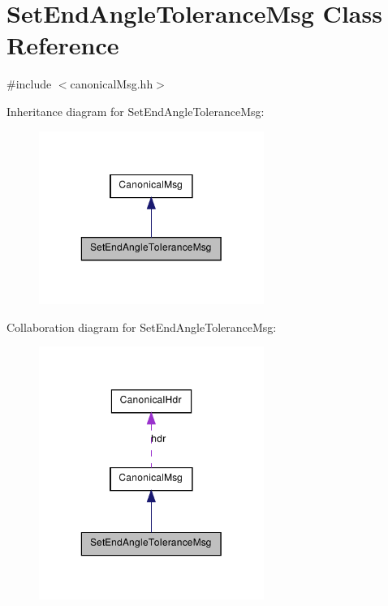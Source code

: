 \hypertarget{class_set_end_angle_tolerance_msg}{
\section{SetEndAngleToleranceMsg Class Reference}
\label{class_set_end_angle_tolerance_msg}
}


{\ttfamily \#include $<$canonicalMsg.hh$>$}



Inheritance diagram for SetEndAngleToleranceMsg:\nopagebreak
\begin{figure}[H]
\begin{center}
\leavevmode
\includegraphics[width=208pt]{class_set_end_angle_tolerance_msg__inherit__graph}
\end{center}
\end{figure}


Collaboration diagram for SetEndAngleToleranceMsg:\nopagebreak
\begin{figure}[H]
\begin{center}
\leavevmode
\includegraphics[width=208pt]{class_set_end_angle_tolerance_msg__coll__graph}
\end{center}
\end{figure}
